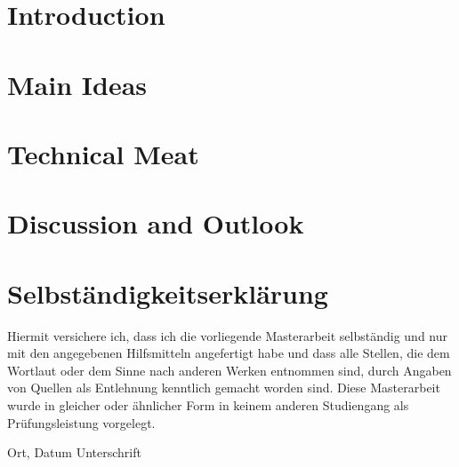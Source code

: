 \documentclass[a4paper,UKenglish,compactauthor]{lipics-v2021}
\begin{document}
\setcounter{page}{1}

\section{Introduction}
\label{sec:introduction}


\section{Main Ideas}
\label{sec:mainideas}


\section{Technical Meat}
\label{sec:technical-meat}


\section{Discussion and Outlook}
\label{sec:discussion}


\cleardoublepage



\cleardoublepage
\thispagestyle{empty}
\section*{Selbständigkeitserklärung}

Hiermit versichere ich, dass ich die vorliegende Masterarbeit
selbständig und nur mit den angegebenen Hilfsmitteln angefertigt habe und dass alle Stellen, die dem Wortlaut oder dem
Sinne nach anderen Werken entnommen sind, durch Angaben von Quellen als
Entlehnung kenntlich gemacht worden sind.
Diese Masterarbeit wurde in gleicher oder ähnlicher Form in keinem anderen
Studiengang als Prüfungsleistung vorgelegt.

\vskip 3cm

Ort, Datum	\hfill Unterschrift \hfill
\end{document}

